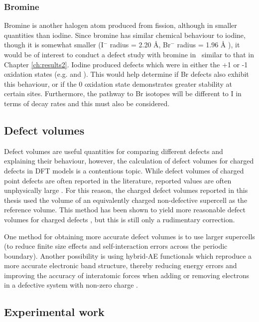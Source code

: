 \subsubsection{Bromine}

Bromine is another halogen atom produced from fission, although in smaller quantities than iodine. Since bromine has similar chemical behaviour to iodine, though it is somewhat smaller (I$^{-}$ radius = 2.20 \r{A}, Br$^{-}$ radius = 1.96 \r{A} \cite{Shannon1976}), it would be of interest to conduct a defect study with bromine in \zirconia\ similar to that in Chapter \ref{ch:results2}. Iodine produced defects which were in either the +1 or -1 oxidation states (e.g.  and ). This would help determine if Br defects also exhibit this behaviour, or if the 0 oxidation state demonstrates greater stability at certain sites. Furthermore, the pathway to Br isotopes will be different to I in terms of decay rates and this must also be considered.

\subsection{Defect volumes}

Defect volumes are useful quantities for comparing different defects and explaining their behaviour, however, the calculation of defect volumes for charged defects in DFT models is a contentious topic. While defect volumes of charged point defects are often reported in the literature, reported values are often unphysically large \cite{Bruneval2015}. For this reason, the charged defect volumes reported in this thesis used the volume of an equivalently charged non-defective supercell as the reference volume. This method has been shown to yield more reasonable defect volumes for charged defects \cite{goyal2017conundrum}, but this is still only a rudimentary correction. 

One method for obtaining more accurate defect volumes is to use larger supercells (to reduce finite size effects and self-interaction errors across the periodic boundary). Another possibility is using hybrid-AE functionals which reproduce a more accurate electronic band structure, thereby reducing energy errors and improving the accuracy of interatomic forces when adding or removing electrons in a defective system with non-zero charge \cite{Brothers2008}.

\subsection{Experimental work}

